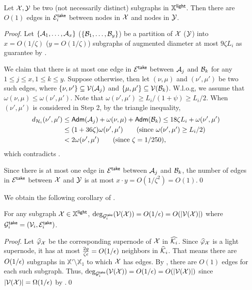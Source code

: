 \begin{lemma}\label{lm:Const-Edge}Let $\mathcal{X}, \mathcal{Y}$ be two (not necessarily distinct) subgraphs in $ \mathbb{X}^{\mathsf{light}}$. Then there are $O(1)$ edges  in $\mathcal{E}_i^{\mathsf{take}}$ between nodes in $\mathcal{X}$ and nodes in $\mathcal{Y}$.
\end{lemma}
\begin{proof} Let  $\{\mathcal{A}_1,\ldots, \mathcal{A}_x\}$ ($\{\mathcal{B}_1,\ldots, \mathcal{B}_{y}\}$) be a partition of $\mathcal{X}$ ($\mathcal{Y}$) into $x = O(1/\zeta)$ ($y = O(1/\zeta)$) subgraphs of augmented diameter at most $9\zeta L_i$ as guarantee by . 
	
	We claim that there is at most one edge in $\mathcal{E}^{\mathsf{take}}$ between $\mathcal{A}_j$ and $\mathcal{B}_k$ for any $1\leq j\leq x, 1\leq k \leq y$. Suppose otherwise, then let $(\nu,\mu)$ and $(\nu',\mu')$ be two such edges, where $\{\nu,\nu'\}\subseteq \mathcal{V}(\mathcal{A}_j)$ and  $\{\mu,\mu'\} \subseteq \mathcal{V}(\mathcal{B}_k)$. W.l.o.g, we assume that $\omega(\nu,\mu) \leq \omega(\nu',\mu')$. Note that $\omega(\nu',\mu')\geq L_i/(1+\psi)\geq L_i/2$. When $(\nu',\mu')$ is considered in Step 2, by the triangle inequality, 
	\begin{equation*}
		\begin{split}
					d_{\mathcal{H}_i }(\nu',\mu') &\leq \mathsf{Adm}(\mathcal{A}_j) + \omega(\nu,\mu) + \mathsf{Adm}(\mathcal{B}_k) \leq 18\zeta L_i + \omega(\nu',\mu')\\
					&\leq (1+36\zeta)\omega(\nu',\mu') \qquad \mbox{(since $\omega(\nu',\mu')\geq L_i/2$)} \\
					& < 2 \omega(\nu',\mu') \qquad\mbox{(since $\zeta = 1/250$)}, 
		\end{split}
	\end{equation*}
	which contradicts . 
	
	Since there is at most one edge in $\mathcal{E}^{\mathsf{take}}$ between $\mathcal{A}_j$ and $\mathcal{B}_k$, the number of edges in $\mathcal{E}^{\mathsf{take}}$ between $\mathcal{X}$ and $\mathcal{Y}$ is at most $x\cdot y = O(1/\zeta^2) = O(1)$.\qed 
\end{proof}

We obtain the following corollary of .

\begin{corollary}\label{cor:bounded-DegXprime}For any subgraph $\mathcal{X} \in  \mathbb{X}^{\mathsf{light}}$,  $\deg_{\mathcal{G}^{\mathsf{take}}_i}(\mathcal{V}(\mathcal{X})) = O(1/\epsilon) = O(|\mathcal{V}(\mathcal{X})|)$ where $\mathcal{G}^{\mathsf{take}}_i = (\mathcal{V}_i,\mathcal{E}_i^{\mathsf{take}})$. 
\end{corollary}
\begin{proof} Let  $\widehat{\varphi}_{\mathcal{X}}$  be the corresponding supernode of $\mathcal{X}$ in $\widehat{\mathcal{K}_i}$. Since $\widehat{\varphi}_{\mathcal{X}}$ is a light supernode, it has at most $\frac{2g}{\zeta \epsilon} = O(1/\epsilon)$ neighbors in $\widehat{\mathcal{K}}_i$. That means there are $O(1/\epsilon)$ subgraphs in  $ \mathbb{X}'\setminus \mathbb{X}_1$ to which  $\mathcal{X}$ has edges. By , there are $O(1)$ edges for each such subgraph. Thus,  $\deg_{\mathcal{G}^{\mathsf{take}}_i}(\mathcal{V}(\mathcal{X})) = O(1/\epsilon) =O(|\mathcal{V}(\mathcal{X})|)$ since $|\mathcal{V}(\mathcal{X})| = \Omega(1/\epsilon)$ by .\qed
\end{proof}

